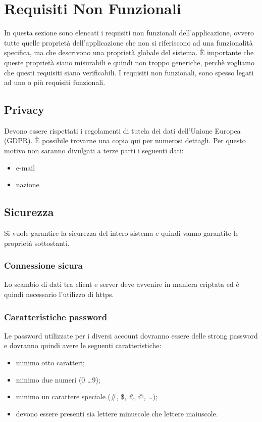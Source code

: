 \section{Requisiti Non Funzionali}
In questa sezione sono elencati i requisiti non funzionali dell'applicazione, ovvero tutte quelle proprietà dell'applicazione che non si riferiscono ad una funzionalità specifica, ma che descrivono una proprietà globale del sistema. È importante che queste proprietà siano misurabili e quindi non troppo generiche, perchè vogliamo che questi requisiti siano verificabili. I requisiti non funzionali, sono spesso legati ad uno o più requisiti funzionali.

\subsection{Privacy}
Devono essere rispettati i regolamenti di tutela dei dati dell'Unione Europea (GDPR). È possibile trovarne una copia \href{https://eur-lex.europa.eu/legal-content/EN/TXT/PDF/?uri=CELEX:32016R0679}{qui} per numerosi dettagli. Per questo motivo non saranno divulgati a terze parti i seguenti dati:
\begin{itemize}
    \item e-mail
    \item nazione
\end{itemize}

\subsection{Sicurezza}
Si vuole garantire la sicurezza del intero sistema e quindi vanno garantite le proprietà sottostanti.

\subsubsection{Connessione sicura}
Lo scambio di dati tra client e server deve avvenire in maniera criptata ed è quindi necessario l'utilizzo di https.

\subsubsection{Caratteristiche password}
Le password utilizzate per i diversi account dovranno essere delle strong password e dovranno quindi avere le seguenti caratteristiche: 
\begin{itemize}
    \item minimo otto caratteri;
    \item minimo due numeri (0 \dots 9);
    \item minimo un carattere speciale (\#, \$, £, @, \dots);
    \item devono essere presenti sia lettere minuscole che lettere maiuscole.
\end{itemize} 

